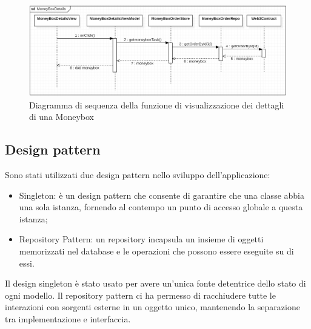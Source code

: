 \begin{figure}[H]
    \begin{center}
    \includegraphics[width=\textwidth]{immagini/moneyboxdetails.png}
    \caption{Diagramma di sequenza della funzione di visualizzazione dei dettagli di una Moneybox}
    \end{center}
\end{figure}

\clearpage

\subsection{Design pattern}

Sono stati utilizzati due design pattern nello sviluppo dell'applicazione:
\begin{itemize}
    \item Singleton: è un design pattern che consente di garantire che una classe abbia una sola istanza, fornendo al contempo un punto di accesso globale a questa istanza;
    \item Repository Pattern: un repository incapsula un insieme di oggetti memorizzati nel database e le operazioni che possono essere eseguite su di essi.
\end{itemize}

Il design singleton è stato usato per avere un'unica fonte detentrice dello stato di ogni modello.
Il repository pattern ci ha permesso di racchiudere tutte le interazioni con sorgenti esterne in un oggetto unico, mantenendo la separazione tra implementazione e interfaccia.


